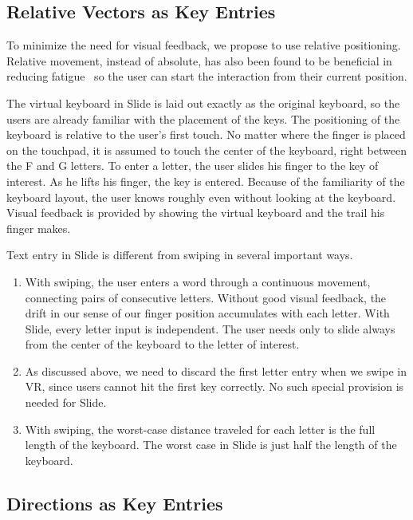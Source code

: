 \subsection{Relative Vectors as Key Entries}

To minimize the need for visual feedback, we propose to use relative positioning.  Relative movement, instead of absolute, has also been found to be beneficial in reducing fatigue~\cite{Hincapie-Ramos:2014:CEM:2556288.2557130} so the user can start the interaction from their current position. 

The virtual keyboard in Slide is laid out exactly as the original keyboard, so the users are already familiar with the placement of the keys.   The positioning of the keyboard is relative to the user’s first touch.  No matter where the finger is placed on the touchpad, it is assumed to touch the center of the keyboard, right between the F and G letters.  To enter a letter, the user slides his finger to the key of interest.  As he lifts his finger, the key is entered.  Because of the familiarity of the keyboard layout, the user knows roughly even without looking at the keyboard.  Visual feedback is provided by showing the virtual keyboard and the trail his finger makes.   

Text entry in Slide is different from swiping in several important ways. 
\begin{enumerate}
\item
With swiping, the user enters a word through a continuous movement, connecting pairs of consecutive letters.  Without good visual feedback, the drift in our sense of our finger position accumulates with each letter.   With Slide, every letter input is independent.  The user needs only to slide always from the center of the keyboard to the letter of interest.  

\item 
As discussed above, we need to discard the first letter entry when we swipe in VR, since users cannot hit the first key correctly.   No such special provision is needed for Slide.

\item
With swiping, the worst-case distance traveled for each letter is the full length of the keyboard.  The worst case in Slide is just half the length of the keyboard. 
\end{enumerate}


\subsection{Directions as Key Entries}

